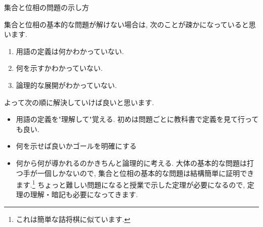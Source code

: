 \documentclass[dvipdfmx,a4paper,11pt]{article}
\theoremstyle{definition}
\begin{document}
\newpage
\begin{center}
{\Large 集合と位相の問題の示し方}
\end{center}
集合と位相の基本的な問題が解けない場合は, 次のことが疎かになっていると思います.
\begin{enumerate}
  \setlength{\parskip}{0cm} %
  \setlength{\itemsep}{0cm} %
\item 用語の定義は何かわかっていない.
\item 何を示すかわかっていない.
\item 論理的な展開がわかっていない.
\end{enumerate}
よって次の順に解決していけば良いと思います.
\begin{itemize}
  \setlength{\parskip}{0cm} %
  \setlength{\itemsep}{0cm} %
\item 用語の定義を"理解して"覚える. 初めは問題ごとに教科書で定義を見て行っても良い.
\item 何を示せば良いかゴールを明確にする
\item 何から何が導かれるのかきちんと論理的に考える. 大体の基本的な問題は打つ手が一個しかないので, 集合と位相の基本的な問題は結構簡単に証明できます.\footnote{これは簡単な詰将棋に似ています.} ちょっと難しい問題になると授業で示した定理が必要になるので, 定理の理解・暗記も必要になってきます.
\end{itemize}
\end{document}
